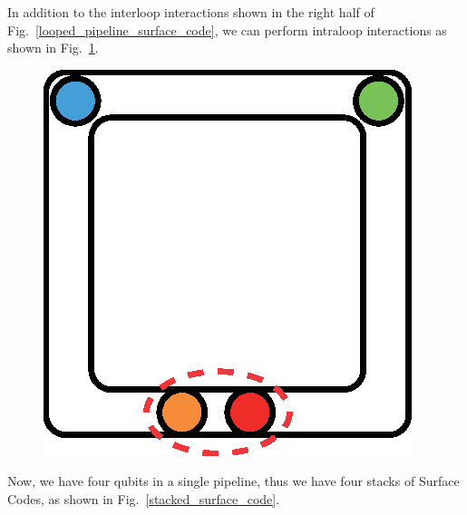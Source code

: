 \documentclass[a4paper,11pt]{ltjsarticle}
\begin{document}
{{        In addition to the interloop interactions shown in the right half of Fig.~\ref{looped_pipeline_surface_code}, we can perform intraloop interactions as shown in Fig.~\ref{intraloop_interaction}.

        \begin{figure}[h]
            \centering
            \includegraphics[scale=0.50]{figure/intraloop_interaction.eps}
            \vspace{0pt}\caption{}
            \label{intraloop_interaction}
            \vspace{-10pt}
        \end{figure}

        Now, we have four qubits in a single pipeline, thus we have four stacks of Surface Codes, as shown in Fig.~\ref{stacked_surface_code}.

        
    }
}
\end{document}
